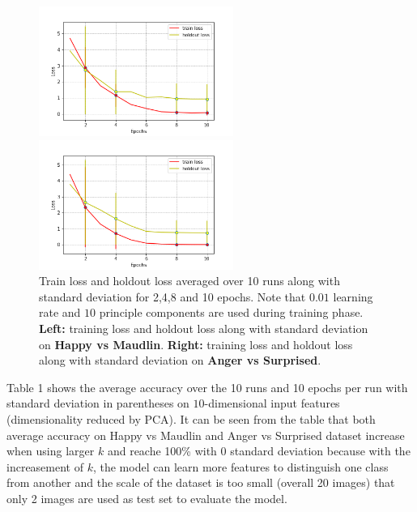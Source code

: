 \documentclass{article}
\begin{document}
\begin{figure}
\begin{center}
\begin{minipage}[t]{0.4\linewidth}
  \centering
  \includegraphics[width=2.5in]{images/hm_loss_recog_85acc.png}
\end{minipage}
\begin{minipage}[t]{0.5\linewidth}
  \centering
  \includegraphics[width=2.5in]{images/as_loss_recog_100acc.png}
\end{minipage}
\caption{Train loss and holdout loss averaged over 10 runs along with standard deviation for 2,4,8 and 10 epochs. Note that $0.01$ learning rate and $10$ principle components are used during training phase. \textbf{Left:} training loss and holdout loss along with standard deviation on \textbf{Happy vs Maudlin}. \textbf{Right:} training loss and holdout loss along with standard deviation on \textbf{Anger vs Surprised}.}
\end{center}
\end{figure}

Table 1 shows the average accuracy over the 10 runs and 10 epochs per run with standard deviation in parentheses on $10$-dimensional input features (dimensionality reduced by PCA). It can be seen from the table that both average accuracy on Happy vs Maudlin and Anger vs Surprised dataset increase when using larger $k$ and reache 100\% with 0 standard deviation because with the increasement of $k$, the model can learn more features to distinguish one class from another and the scale of the dataset is too small (overall 20 images) that only 2 images are used as test set to evaluate the model.
\end{document}
